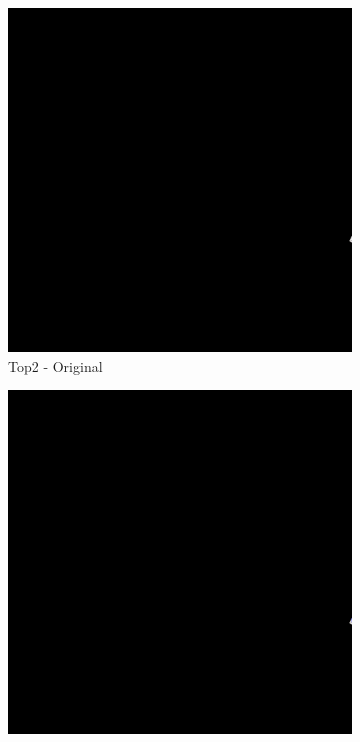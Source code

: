 \begin{figure}[H]
\begin{subfigure}{0.32\textwidth}
    \includegraphics[width=\textwidth]{02-main//figures/ch4/kfold_ensembles/linknet_timm-efficientnet-b5/worst_cases/worst_4_iou0.000_25011125_tile_14_5_cdc6dc_original.png}
    \caption{Top2 - Original}
\end{subfigure}
\hfill
\begin{subfigure}{0.32\textwidth}
    \includegraphics[width=\textwidth]{02-main//figures/ch4/kfold_ensembles/linknet_timm-efficientnet-b5/worst_cases/worst_4_iou0.000_25011125_tile_14_5_cdc6dc_overlay_gt.png}

\end{subfigure}
\end{figure}

